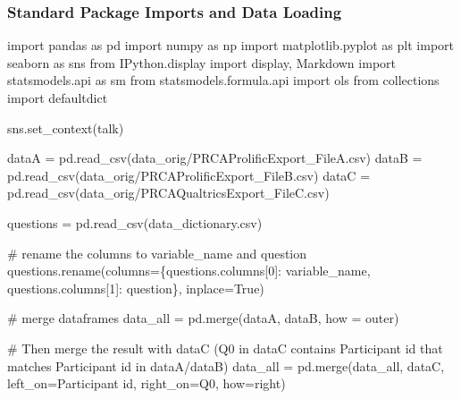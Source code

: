 \documentclass[
  letterpaper,
  DIV=11,
  numbers=noendperiod]{scrartcl}
\newenvironment{Shaded}{\begin{snugshade}}{\end{snugshade}}
\newcommand{\CommentTok}[1]{\textcolor[rgb]{0.37,0.37,0.37}{#1}}
\newcommand{\DecValTok}[1]{\textcolor[rgb]{0.68,0.00,0.00}{#1}}
\newcommand{\ImportTok}[1]{\textcolor[rgb]{0.00,0.46,0.62}{#1}}
\newcommand{\NormalTok}[1]{\textcolor[rgb]{0.00,0.23,0.31}{#1}}
\newcommand{\OperatorTok}[1]{\textcolor[rgb]{0.37,0.37,0.37}{#1}}
\newcommand{\StringTok}[1]{\textcolor[rgb]{0.13,0.47,0.30}{#1}}
\newcommand{\VariableTok}[1]{\textcolor[rgb]{0.07,0.07,0.07}{#1}}
\begin{document}
\subsubsection{Standard Package Imports and Data
Loading}\label{standard-package-imports-and-data-loading}

\protect{}\label{load-packages-data}
\begin{Shaded}
\begin{Highlighting}[]
\ImportTok{import}\NormalTok{ pandas }\ImportTok{as}\NormalTok{ pd}
\ImportTok{import}\NormalTok{ numpy }\ImportTok{as}\NormalTok{ np}
\ImportTok{import}\NormalTok{ matplotlib.pyplot }\ImportTok{as}\NormalTok{ plt}
\ImportTok{import}\NormalTok{ seaborn }\ImportTok{as}\NormalTok{ sns}
\ImportTok{from}\NormalTok{ IPython.display }\ImportTok{import}\NormalTok{ display, Markdown}
\ImportTok{import}\NormalTok{ statsmodels.api }\ImportTok{as}\NormalTok{ sm}
\ImportTok{from}\NormalTok{ statsmodels.formula.api }\ImportTok{import}\NormalTok{ ols}
\ImportTok{from}\NormalTok{ collections }\ImportTok{import}\NormalTok{ defaultdict}

\NormalTok{sns.set\_context(}\StringTok{\textquotesingle{}talk\textquotesingle{}}\NormalTok{)}

\NormalTok{dataA }\OperatorTok{=}\NormalTok{ pd.read\_csv(}\StringTok{\textquotesingle{}data\_orig/PRCAProlificExport\_FileA.csv\textquotesingle{}}\NormalTok{)}
\NormalTok{dataB }\OperatorTok{=}\NormalTok{ pd.read\_csv(}\StringTok{\textquotesingle{}data\_orig/PRCAProlificExport\_FileB.csv\textquotesingle{}}\NormalTok{)}
\NormalTok{dataC }\OperatorTok{=}\NormalTok{ pd.read\_csv(}\StringTok{\textquotesingle{}data\_orig/PRCAQualtricsExport\_FileC.csv\textquotesingle{}}\NormalTok{)}

\NormalTok{questions }\OperatorTok{=}\NormalTok{ pd.read\_csv(}\StringTok{\textquotesingle{}data\_dictionary.csv\textquotesingle{}}\NormalTok{)}


\CommentTok{\# rename the columns to variable\_name and question}
\NormalTok{questions.rename(columns}\OperatorTok{=}\NormalTok{\{questions.columns[}\DecValTok{0}\NormalTok{]: }\StringTok{\textquotesingle{}variable\_name\textquotesingle{}}\NormalTok{, questions.columns[}\DecValTok{1}\NormalTok{]: }\StringTok{\textquotesingle{}question\textquotesingle{}}\NormalTok{\}, inplace}\OperatorTok{=}\VariableTok{True}\NormalTok{)}

\CommentTok{\# merge dataframes}
\NormalTok{data\_all }\OperatorTok{=}\NormalTok{ pd.merge(dataA, dataB, how }\OperatorTok{=} \StringTok{\textquotesingle{}outer\textquotesingle{}}\NormalTok{)}

\CommentTok{\# Then merge the result with dataC (Q0 in dataC contains Participant id that matches Participant id in dataA/dataB)}
\NormalTok{data\_all }\OperatorTok{=}\NormalTok{ pd.merge(data\_all, dataC, left\_on}\OperatorTok{=}\StringTok{\textquotesingle{}Participant id\textquotesingle{}}\NormalTok{, right\_on}\OperatorTok{=}\StringTok{\textquotesingle{}Q0\textquotesingle{}}\NormalTok{, how}\OperatorTok{=}\StringTok{\textquotesingle{}right\textquotesingle{}}\NormalTok{)}
\end{Highlighting}
\end{Shaded}
\end{document}
